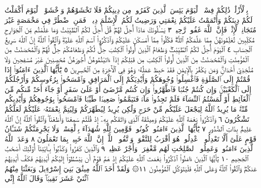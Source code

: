 بِٱلْأَزْلَٰمِۚ ذَٰلِكُمْ فِسْقٌۗ ٱلْيَوْمَ يَئِسَ ٱلَّذِينَ كَفَرُوا۟ مِن دِينِكُمْ فَلَا
تَخْشَوْهُمْ وَٱخْشَوْنِۚ ٱلْيَوْمَ أَكْمَلْتُ لَكُمْ دِينَكُمْ وَأَتْمَمْتُ عَلَيْكُمْ
نِعْمَتِي وَرَضِيتُ لَكُمُ ٱلْإِسْلَٰمَ دِينࣰاۚ فَمَنِ ٱضْطُرَّ فِي مَخْمَصَةٍ
غَيْرَ مُتَجَانِفࣲ لِّإِثْمࣲ فَإِنَّ ٱللَّهَ غَفُورࣱ رَّحِيمࣱ ٣ يَسْـَٔلُونَكَ مَاذَآ
أُحِلَّ لَهُمْۖ قُلْ أُحِلَّ لَكُمُ ٱلطَّيِّبَٰتُ وَمَا عَلَّمْتُم مِّنَ ٱلْجَوَارِحِ
مُكَلِّبِينَ تُعَلِّمُونَهُنَّ مِمَّا عَلَّمَكُمُ ٱللَّهُۖ فَكُلُوا۟ مِمَّآ أَمْسَكْنَ عَلَيْكُمْ
وَٱذْكُرُوا۟ ٱسْمَ ٱللَّهِ عَلَيْهِۖ وَٱتَّقُوا۟ ٱللَّهَۚ إِنَّ ٱللَّهَ سَرِيعُ ٱلْحِسَابِ ٤
ٱلْيَوْمَ أُحِلَّ لَكُمُ ٱلطَّيِّبَٰتُۖ وَطَعَامُ ٱلَّذِينَ أُوتُوا۟ ٱلْكِتَٰبَ حِلࣱّ لَّكُمْ
وَطَعَامُكُمْ حِلࣱّ لَّهُمْۖ وَٱلْمُحْصَنَٰتُ مِنَ ٱلْمُؤْمِنَٰتِ وَٱلْمُحْصَنَٰتُ
مِنَ ٱلَّذِينَ أُوتُوا۟ ٱلْكِتَٰبَ مِن قَبْلِكُمْ إِذَآ ءَاتَيْتُمُوهُنَّ أُجُورَهُنَّ
مُحْصِنِينَ غَيْرَ مُسَٰفِحِينَ وَلَا مُتَّخِذِيٓ أَخْدَانࣲۗ وَمَن يَكْفُرْ
بِٱلْإِيمَٰنِ فَقَدْ حَبِطَ عَمَلُهُۥ وَهُوَ فِي ٱلْأٓخِرَةِ مِنَ ٱلْخَٰسِرِينَ ٥
يَٰٓأَيُّهَا ٱلَّذِينَ ءَامَنُوٓا۟ إِذَا قُمْتُمْ إِلَى ٱلصَّلَوٰةِ فَٱغْسِلُوا۟
وُجُوهَكُمْ وَأَيْدِيَكُمْ إِلَى ٱلْمَرَافِقِ وَٱمْسَحُوا۟ بِرُءُوسِكُمْ
وَأَرْجُلَكُمْ إِلَى ٱلْكَعْبَيْنِۚ وَإِن كُنتُمْ جُنُبࣰا فَٱطَّهَّرُوا۟ۚ
وَإِن كُنتُم مَّرْضَىٰٓ أَوْ عَلَىٰ سَفَرٍ أَوْ جَآءَ أَحَدࣱ مِّنكُم مِّنَ
ٱلْغَآئِطِ أَوْ لَٰمَسْتُمُ ٱلنِّسَآءَ فَلَمْ تَجِدُوا۟ مَآءࣰ فَتَيَمَّمُوا۟ صَعِيدࣰا
طَيِّبࣰا فَٱمْسَحُوا۟ بِوُجُوهِكُمْ وَأَيْدِيكُم مِّنْهُۚ مَا يُرِيدُ ٱللَّهُ
لِيَجْعَلَ عَلَيْكُم مِّنْ حَرَجࣲ وَلَٰكِن يُرِيدُ لِيُطَهِّرَكُمْ
وَلِيُتِمَّ نِعْمَتَهُۥ عَلَيْكُمْ لَعَلَّكُمْ تَشْكُرُونَ ٦
وَٱذْكُرُوا۟ نِعْمَةَ ٱللَّهِ عَلَيْكُمْ وَمِيثَٰقَهُ ٱلَّذِي وَاثَقَكُم
بِهِۦٓ إِذْ قُلْتُمْ سَمِعْنَا وَأَطَعْنَاۖ وَٱتَّقُوا۟ ٱللَّهَۚ إِنَّ ٱللَّهَ عَلِيمُۢ
بِذَاتِ ٱلصُّدُورِ ٧ يَٰٓأَيُّهَا ٱلَّذِينَ ءَامَنُوا۟ كُونُوا۟ قَوَّٰمِينَ
لِلَّهِ شُهَدَآءَ بِٱلْقِسْطِۖ وَلَا يَجْرِمَنَّكُمْ شَنَـَٔانُ قَوْمٍ عَلَىٰٓ
أَلَّا تَعْدِلُوا۟ۚ ٱعْدِلُوا۟ هُوَ أَقْرَبُ لِلتَّقْوَىٰۖ وَٱتَّقُوا۟ ٱللَّهَۚ إِنَّ
ٱللَّهَ خَبِيرُۢ بِمَا تَعْمَلُونَ ٨ وَعَدَ ٱللَّهُ ٱلَّذِينَ ءَامَنُوا۟
وَعَمِلُوا۟ ٱلصَّٰلِحَٰتِ لَهُم مَّغْفِرَةࣱ وَأَجْرٌ عَظِيمࣱ ٩
وَٱلَّذِينَ كَفَرُوا۟ وَكَذَّبُوا۟ بِـَٔايَٰتِنَآ أُو۟لَٰٓئِكَ أَصْحَٰبُ
ٱلْجَحِيمِ ١٠ يَٰٓأَيُّهَا ٱلَّذِينَ ءَامَنُوا۟ ٱذْكُرُوا۟ نِعْمَتَ
ٱللَّهِ عَلَيْكُمْ إِذْ هَمَّ قَوْمٌ أَن يَبْسُطُوٓا۟ إِلَيْكُمْ أَيْدِيَهُمْ
فَكَفَّ أَيْدِيَهُمْ عَنكُمْۖ وَٱتَّقُوا۟ ٱللَّهَۚ وَعَلَى ٱللَّهِ فَلْيَتَوَكَّلِ
ٱلْمُؤْمِنُونَ ١١۞ وَلَقَدْ أَخَذَ ٱللَّهُ مِيثَٰقَ بَنِيٓ إِسْرَٰٓءِيلَ
وَبَعَثْنَا مِنْهُمُ ٱثْنَيْ عَشَرَ نَقِيبࣰاۖ وَقَالَ ٱللَّهُ إِنِّي
